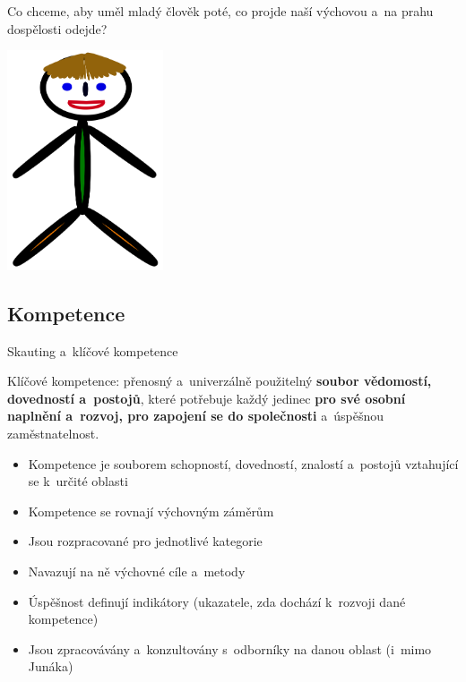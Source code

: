 \documentclass[hyperref={bookmarks=true, unicode=true, colorlinks=true, plainpages=false, pdfkeywords={Skaut, Junak, Skauting, Vychovna metoda}, linkcolor=OrangeRed, anchorcolor=OrangeRed, citecolor=RawSienna, filecolor=RawSienna, menucolor=OrangeRed, urlcolor=RawSienna, pdftex}, compress, xelatex, xcolor=dvipsnames, print]{beamer}
\begin{document}
\begin{frame}{Co chceme, aby uměl mladý člověk poté, co projde naší výchovou a~na prahu dospělosti odejde?}
\begin{center}
\includegraphics[height=6.5cm]{pepicek.png}
\end{center}
\end{frame}

\subsection{Kompetence}

\begin{frame}{Skauting a~klíčové kompetence}
\begin{center}
Klíčové kompetence: přenosný a~univerzálně použitelný \textbf{soubor vědomostí, dovedností a~postojů}, které potřebuje každý jedinec \textbf{pro své osobní naplnění a~rozvoj, pro zapojení se do společnosti} a~úspěšnou zaměstnatelnost.
\end{center}
\begin{itemize}
\item Kompetence je souborem schopností, dovedností, znalostí a~postojů vztahující se k~určité oblasti
\item Kompetence se rovnají výchovným záměrům
\item Jsou rozpracované pro jednotlivé kategorie
\item Navazují na ně výchovné cíle a~metody
\item Úspěšnost definují indikátory (ukazatele, zda dochází k~rozvoji dané kompetence)
\item Jsou zpracovávány a~konzultovány s~odborníky na danou oblast (i~mimo Junáka)
\end{itemize}
\end{frame}
\end{document}
